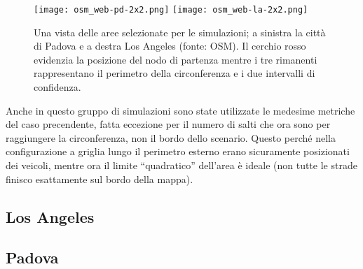 %
\begin{figure}[htbp]
	\centering
		\texttt{[image: osm\_web-pd-2x2.png]}
		\hfill
		\texttt{[image: osm\_web-la-2x2.png]}
\caption{Una vista delle aree selezionate per le simulazioni; a sinistra la città di Padova e a destra Los Angeles (fonte: OSM).
Il cerchio rosso evidenzia la posizione del nodo di partenza mentre i tre rimanenti rappresentano il perimetro della circonferenza
e i due intervalli di confidenza.\label{fig:scenari-la-pd-osm}}
\end{figure}
%
Anche in questo gruppo di simulazioni sono state utilizzate le medesime metriche del caso precendente,
fatta eccezione per il numero di salti che ora sono per raggiungere la circonferenza, non il bordo dello scenario.
Questo perché nella configurazione a griglia lungo il perimetro esterno erano sicuramente posizionati dei veicoli,
mentre ora il limite ``quadratico'' dell'area è ideale (non tutte le strade finisco esattamente sul bordo della mappa).
%
\subsection{Los Angeles}\label{subsec:risultati-la}
%
\subsection{Padova}\label{subsec:risultati-pd}

